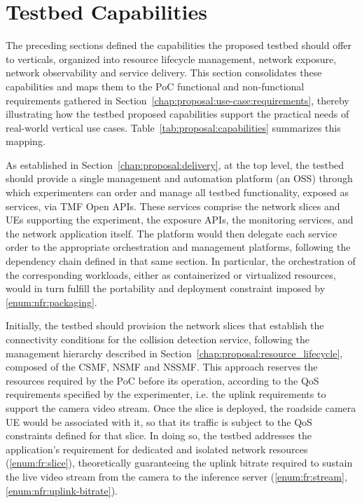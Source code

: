 \section{Testbed Capabilities}
\label{chap:proposal:capabilities}

The preceding sections defined the capabilities the proposed testbed should offer to verticals, organized into resource lifecycle management, network exposure, network observability and service delivery. This section consolidates these capabilities and maps them to the \acs{PoC} functional and non-functional requirements gathered in Section~\ref{chap:proposal:use-case:requirements}, thereby illustrating how the testbed proposed capabilities support the practical needs of real-world vertical use cases. Table~\ref{tab:proposal:capabilities} summarizes this mapping.

As established in Section~\ref{chap:proposal:delivery}, at the top level, the testbed should provide a single management and automation platform (an \acs{OSS}) through which experimenters can order and manage all testbed functionality, exposed as services, via \acs{TMF} Open \acsp{API}. These services comprise the network slices and \acsp{UE} supporting the experiment, the exposure \acsp{API}, the monitoring services, and the network application itself. The platform would then delegate each service order to the appropriate orchestration and management platforms, following the dependency chain defined in that same section. In particular, the orchestration of the corresponding workloads, either as containerized or virtualized resources, would in turn fulfill the portability and deployment constraint imposed by \ref{enum:nfr:packaging}.

Initially, the testbed should provision the network slices that establish the connectivity conditions for the collision detection service, following the management hierarchy described in Section~\ref{chap:proposal:resource_lifecycle}, composed of the \acs{CSMF}, \acs{NSMF} and \acs{NSSMF}. This approach reserves the resources required by the \acs{PoC} before its operation, according to the \acs{QoS} requirements specified by the experimenter, i.e. the uplink requirements to support the camera video stream. Once the slice is deployed, the roadside camera \acs{UE} would be associated with it, so that its traffic is subject to the \acs{QoS} constraints defined for that slice. In doing so, the testbed addresses the application's requirement for dedicated and isolated network resources (\ref{enum:fr:slice}), theoretically guaranteeing the uplink bitrate required to sustain the live video stream from the camera to the inference server (\ref{enum:fr:stream}, \ref{enum:nfr:uplink-bitrate}).

